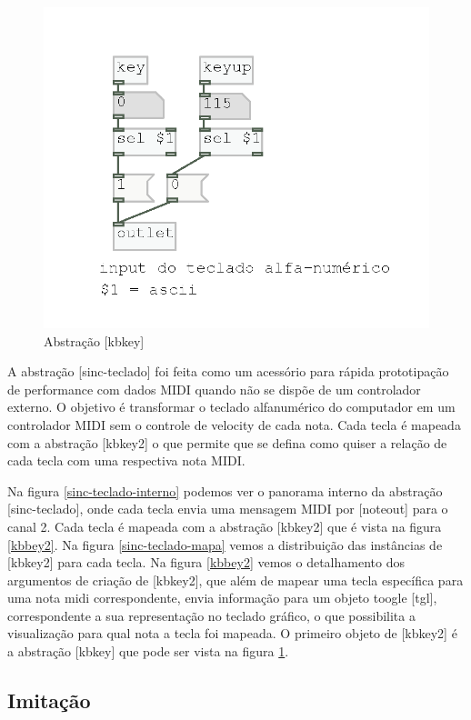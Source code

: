 \documentclass{ppgmus}
\begin{document}
\begin{figure}
\includegraphics[scale=.5]{kbkey}
\caption{Abstração [kbkey]}
\label{kbkey}
\end{figure}


A abstração [sinc-teclado] foi feita como um acessório para rápida prototipação de 
performance com dados MIDI quando não se dispõe de um controlador externo. O objetivo
é transformar o teclado alfanumérico do computador em um controlador MIDI sem o controle de velocity
de cada nota. Cada tecla é mapeada com a abstração [kbkey2] o que permite que se defina como quiser
a relação de cada tecla com uma respectiva nota MIDI.

Na figura \ref{sinc-teclado-interno} podemos ver o panorama interno da abstração [sinc-teclado], onde cada tecla 
envia uma mensagem MIDI por [noteout] para o canal 2.
Cada tecla é mapeada com a abstração [kbkey2] que é vista na figura \ref{kbbey2}. 
Na figura \ref{sinc-teclado-mapa} vemos a distribuição das instâncias de [kbkey2] para
cada tecla. Na figura \ref{kbbey2} vemos o detalhamento dos argumentos de criação de [kbkey2], que além de mapear
uma tecla específica para uma nota midi correspondente, envia informação para um objeto toogle [tgl],
correspondente a sua representação no teclado gráfico, o que possibilita a visualização para qual nota
a tecla foi mapeada. O primeiro objeto de [kbkey2] é a abstração [kbkey] que pode ser vista na figura \ref{kbkey}.




\subsection{Imitação}
\end{document}

